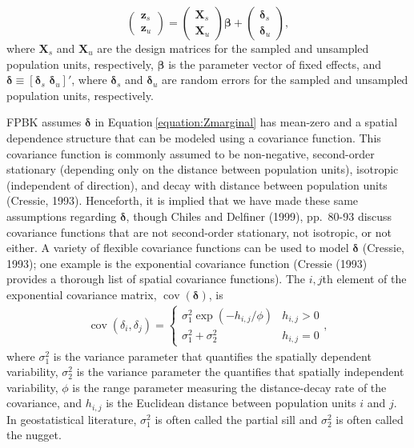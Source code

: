 \documentclass[]{elsarticle} %
\begin{document}
\begin{equation}
\begin{pmatrix} \label{equation:Zmarginal}
    \mathbf{z}_s      \\
    \mathbf{z}_u
\end{pmatrix}
=
\begin{pmatrix}
  \mathbf{X}_s    \\
  \mathbf{X}_u
\end{pmatrix}
\bm{\beta} +
\begin{pmatrix}
\bm{\delta}_s    \\
\bm{\delta}_u
\end{pmatrix},
\end{equation} where \(\mathbf{X}_s\) and \(\mathbf{X}_u\) are the
design matrices for the sampled and unsampled population units,
respectively, \(\bm{\beta}\) is the parameter vector of fixed effects,
and \(\bm{\delta} \equiv [\bm{\delta}_s \,\, \bm{\delta}_u]'\), where
\(\bm{\delta}_s\) and \(\bm{\delta}_u\) are random errors for the
sampled and unsampled population units, respectively.

FPBK assumes \(\bm{\delta}\) in Equation\(~\)\ref{equation:Zmarginal}
has mean-zero and a spatial dependence structure that can be modeled
using a covariance function. This covariance function is commonly
assumed to be non-negative, second-order stationary (depending only on
the distance between population units), isotropic (independent of
direction), and decay with distance between population units (Cressie,
1993). Henceforth, it is implied that we have made these same
assumptions regarding \(\bm{\delta}\), though Chiles and Delfiner
(1999), pp.~80-93 discuss covariance functions that are not second-order
stationary, not isotropic, or not either. A variety of flexible
covariance functions can be used to model \(\bm{\delta}\) (Cressie,
1993); one example is the exponential covariance function (Cressie
(1993) provides a thorough list of spatial covariance functions). The
\(i,j\)th element of the exponential covariance matrix,
\(\mathop{\mathrm{{cov}}}(\bm{\delta})\), is \mbox{}
\begin{align}\label{equation:expcov}
\mathop{\mathrm{{cov}}}(\delta_i, \delta_j) = 
\begin{cases} 
\sigma^2_{1}\exp(-h_{i,j}/\phi) & h_{i,j} > 0 \\
\sigma^2_{1} + \sigma^2_2 & h_{i,j} = 0
\end{cases}
,
\end{align} where \(\sigma^2_{1}\) is the variance parameter that
quantifies the spatially dependent variability, \(\sigma^2_{2}\) is the
variance parameter the quantifies that spatially independent
variability, \(\phi\) is the range parameter measuring the
distance-decay rate of the covariance, and \(h_{i,j}\) is the Euclidean
distance between population units \(i\) and \(j\). In geostatistical
literature, \(\sigma^2_{1}\) is often called the partial sill and
\(\sigma^2_{2}\) is often called the nugget.
\end{document}

